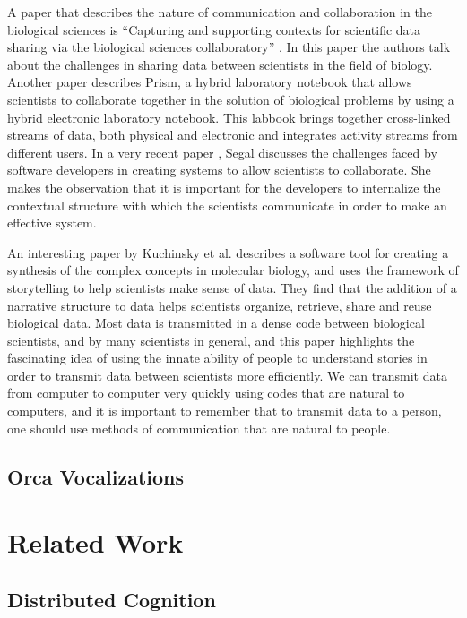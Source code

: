 A paper that describes the nature of communication and
collaboration in the biological sciences is ``Capturing and supporting
contexts for scientific data sharing via the biological sciences
collaboratory'' \cite{chin04}.  In this paper the authors talk about
the challenges in sharing data between scientists in the field of
biology.  Another paper \cite{tabard08} describes Prism, a hybrid
laboratory notebook that allows scientists to collaborate together in
the solution of biological problems by using a hybrid electronic
laboratory notebook.  This labbook brings together cross-linked
streams of data, both physical and electronic and integrates activity
streams from different users.  In a very recent paper \cite{segal09},
Segal discusses the challenges faced by software developers in
creating systems to allow scientists to collaborate.  She makes the
observation that it is important for the developers to internalize the
contextual structure with which the scientists communicate in order to
make an effective system.

An interesting paper by Kuchinsky et al. \cite{kuchinsky02} describes
a software tool for creating a synthesis of the complex concepts in
molecular biology, and uses the framework of storytelling to help
scientists make sense of data.  They find that the addition of a
narrative structure to data helps scientists organize, retrieve, share
and reuse biological data.  Most data is transmitted in a dense code
between biological scientists, and by many scientists in general, and
this paper highlights the fascinating idea of using the innate ability
of people to understand stories in order to transmit data between
scientists more efficiently.  We can transmit data from computer to
computer very quickly using codes that are natural to computers, and
it is important to remember that to transmit data to a person, one
should use methods of communication that are natural to people.

\subsection{Orca Vocalizations}



\section{Related Work}

\subsection{Distributed Cognition}

